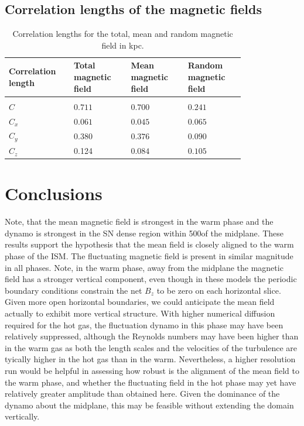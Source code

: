 \documentclass[useAMS,usenatbib]{mn2e}
\begin{document}
\subsection{Correlation lengths of the magnetic fields}
\begin{table}[H]
 \centering
  \caption{Correlation lengths for the total, mean and random magnetic field in kpc.}
  \label{table:mean_probs}
\begin{tabular*}{\linewidth}{p{0.20\linewidth}p{0.20\linewidth}p{0.2\linewidth}p{0.2\linewidth}@{}}
  \hline
Correlation length &Total magnetic field& Mean magnetic field& Random magnetic field \\
 \hline
\\
$C$&$0.711$&$0.700$&$0.241$ \\
$C_x$& $0.061$&$0.045$&$0.065$   \\
$C_y$&$0.380$ & $0.376$&$0.090$    \\
$C_z$&0.124&$0.084$&$0.105$\\
\hline
\end{tabular*}
\end{table}


 
\section{Conclusions}
Note, that the mean magnetic field is strongest in the warm phase and the 
dynamo is strongest in the SN dense region within 500\pc of the midplane. 
These results support the hypothesis that the mean field is closely aligned to 
the warm phase of the ISM.
The fluctuating magnetic field is present in similar magnitude in all phases.
Note, in the warm phase, away from the midplane the magnetic field has a 
stronger vertical component, even though in these models the periodic boundary
conditions constrain the net $B_z$ to be zero on each horizontal slice. 
Given more open horizontal boundaries, we could anticipate the mean field 
actually to exhibit more vertical structure. 
With higher numerical diffusion required for the hot gas, the fluctuation 
dynamo in this phase may have been relatively suppressed, although the 
Reynolds numbers may have been higher than in the warm gas as both the length
scales and the velocities of the turbulence are tyically higher in the hot gas
than in the warm.
Nevertheless, a higher resolution run would be helpful in assessing how robust
is the alignment of the mean field to the warm phase, and whether the
fluctuating field in the hot phase may yet have relatively greater amplitude
than obtained here.
Given the dominance of the dynamo about the midplane, this may be feasible
without extending the domain vertically.
\end{document}
